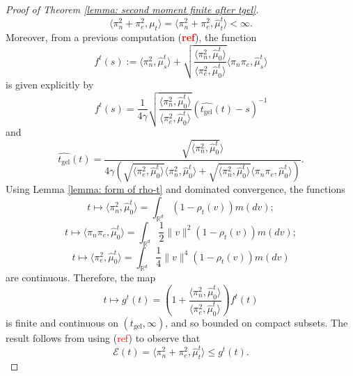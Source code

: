 \begin{proof}[Proof of Theorem \ref{lemma: second moment finite after tgel}]
\begin{equation}
   \langle \pi_n^2+ \pi_e^2, \mu_t\rangle = \langle \pi_n^2+\pi_e^2, \widehat{\mu}^t_{t}\rangle <\infty.
\end{equation} Moreover, from a previous computation (\textbf{\textcolor{red}{ref}}), the function \begin{equation}
    f^t(s):=\langle \pi_n^2, \widehat{\mu}^t_s\rangle +\sqrt{\frac{\langle \pi_n^2, \widehat{\mu}^t_0\rangle}{\langle \pi_e^2, \widehat{\mu}^t_0 \rangle}}\langle \pi_n\pi_e, \widehat{\mu}^t_s\rangle
\end{equation}is given explicitly by \begin{equation}
    f^t(s)=\frac{1}{4\gamma}\sqrt{\frac{\langle\pi_n^2, \widehat{\mu}^t_0\rangle }{\langle \pi_e^2, \widehat{\mu}^t_0\rangle}}\left(\widehat{t_\text{gel}}(t)-s\right)^{-1}
\end{equation} and \begin{equation}
    \widehat{t_\text{gel}}(t)=\frac{\sqrt{\langle \pi_n^2, \widehat{\mu}^t_0}\rangle}{4\gamma\left(\sqrt{\langle \pi_e^2, \widehat{\mu}^t_0 \rangle}\langle \pi_n^2, \widehat{\mu}^t_0\rangle +\sqrt{\langle \pi_n^2, \widehat{\mu}^t_0\rangle}\langle \pi_n\pi_e, \widehat{\mu}^t_0\rangle\right)}.
\end{equation} Using Lemma \ref{lemma: form of rho-t} and dominated convergence, the functions \begin{equation}
    t\mapsto \langle \pi_n^2, \widehat{\mu}^t_0\rangle =\int_{\mathbb{R}^d} (1-\rho_t(v)) m(dv);
\end{equation} \begin{equation}
    t\mapsto \langle \pi_n \pi_e, \widehat{\mu}^t_0\rangle =\int_{\mathbb{R}^d} \frac{1}{2}\|v\|^2(1-\rho_t(v)) m(dv);
\end{equation} \begin{equation}
    t\mapsto \langle \pi_e^2, \widehat{\mu}^t_0\rangle =\int_{\mathbb{R}^d} \frac{1}{4}\|v\|^4(1-\rho_t(v)) m(dv)
\end{equation} are continuous. Therefore, the map \begin{equation}
    t\mapsto g^t(t)= \left(1+\frac{\langle \pi_n^2, \widehat{\mu}^t_0\rangle}{\langle \pi_e^2, \widehat{\mu}^t_0\rangle}\right)f^t(t)
\end{equation} is finite and continuous on $(t_\text{gel}, \infty)$, and so bounded on compact subsets. The result follows from using (\textcolor{red}{ref}) to observe that \begin{equation}
    \mathcal{E}(t)=\langle \pi_n^2+\pi_e^2, \widehat{\mu}^t_t\rangle \leq g^t(t).
\end{equation} \end{proof}

